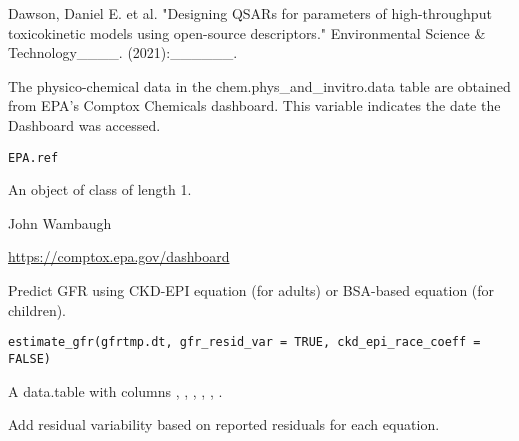\documentclass[a4paper]{book}
\begin{document}
%
\begin{References}\relax
Dawson, Daniel E. et al. "Designing QSARs for parameters
of high-throughput toxicokinetic models using open-source descriptors."
Environmental Science \& Technology\_\_\_\_. (2021):\_\_\_\_\_\_.
\end{References}
%
\begin{Description}\relax
The physico-chemical data in the chem.phys\_and\_invitro.data table are
obtained from EPA's Comptox Chemicals dashboard. This variable indicates
the date the Dashboard was accessed.
\end{Description}
%
\begin{Usage}
\begin{verbatim}
EPA.ref
\end{verbatim}
\end{Usage}
%
\begin{Format}
An object of class  of length 1.
\end{Format}
%
\begin{Author}\relax
John Wambaugh
\end{Author}
%
\begin{Source}\relax
\url{https://comptox.epa.gov/dashboard}
\end{Source}
%
\begin{Description}\relax
Predict GFR using CKD-EPI equation (for adults) or BSA-based equation (for children).
\end{Description}
%
\begin{Usage}
\begin{verbatim}
estimate_gfr(gfrtmp.dt, gfr_resid_var = TRUE, ckd_epi_race_coeff = FALSE)
\end{verbatim}
\end{Usage}
%
\begin{Arguments}
\begin{ldescription}
\item[\code{gfrtmp.dt}] A data.table with columns , , 
, , , .
\end{ldescription}
\end{Arguments}
%
\begin{Details}\relax
Add residual variability based on reported residuals for each equation.
\end{Details}
\end{document}

